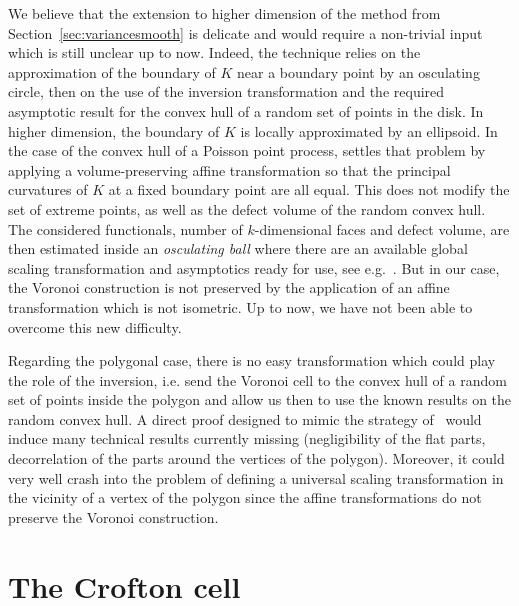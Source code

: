 \documentclass[10pt]{amsart}
\theoremstyle{definition}\newtheorem{defi}[theo]{Definition}\newtheorem{rema}[theo]{Remark}\newtheorem{exam}[theo]{Example}\newtheorem{exem}[theo]{Example}\newtheorem{nota}[theo]{Notation}
\newcommand{\pass}{\vspace{0.3cm}\noindent}
\begin{document}
We believe that the extension to higher dimension of the method from Section~\ref{sec:variancesmooth} is delicate and would require a non-trivial input which is still unclear up to now. Indeed, the technique relies on the approximation of the boundary of $K$ near a boundary point by an osculating circle, then on the use of the inversion transformation and the required asymptotic result for the convex hull of a random set of points in the disk. In higher dimension, the boundary of $K$ is locally approximated by an ellipsoid. In the case of the convex hull of a Poisson point process, \cite{cy14} settles that problem by applying a volume-preserving affine transformation so that the principal curvatures of $K$ at a fixed boundary point are all equal. This does not modify the set of extreme points, as well as the defect volume of the random convex hull. The considered functionals, number of $k$-dimensional faces and defect volume, are then estimated inside an \emph{osculating ball} where there are an available global scaling transformation and asymptotics ready for use, see e.g.~\cite{CSY,cy14}. But in our case, the Voronoi construction is not preserved by the application of an affine transformation which is not isometric. Up to now, we have not been able to overcome this new difficulty.

Regarding the polygonal case, there is no easy transformation which could play the role of the inversion, i.e. send the Voronoi cell to the convex hull of a random set of points inside the polygon and allow us then to use the known results on the random convex hull. A direct proof designed to mimic the strategy of~\cite{cy17} would induce many technical results currently missing (negligibility of the flat parts, decorrelation of the parts around the vertices of the polygon). Moreover, it could very well crash into the problem of defining a universal scaling transformation in the vicinity of a vertex of the polygon since the affine transformations do not preserve the Voronoi construction.



\section{The Crofton cell}\label{sec:crofton}
\end{document}
